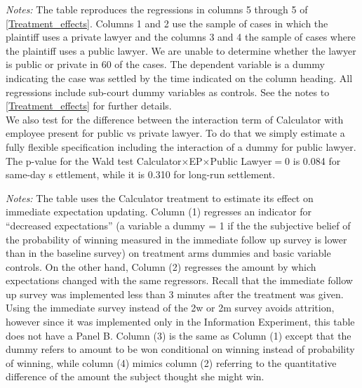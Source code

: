 \documentclass[11pt, a4paper]{article}
\begin{document}
\begin{table}[!ht]
    \caption{Treatment Effects conditional on type of lawyer}
    \label{te_bylawyer}
    \begin{center}
    \scriptsize{}
    \end{center}
     \scriptsize
    \textit{Notes:} The table reproduces the regressions in columns 5 through 5 of \ref{Treatment_effects}. Columns 1 and 2 use the sample of cases in which the plaintiff uses a private lawyer and the columns 3 and 4 the sample of cases where the plaintiff uses a public lawyer. We are unable to determine whether the lawyer is public or private in 60 of the cases. The dependent variable is a dummy indicating the case was settled by the time indicated on the column heading. All regressions include sub-court dummy variables as controls. See the notes to \ref{Treatment_effects} for further details. \\
         
         
    We also test for the difference between the interaction term of Calculator with employee present for public vs private lawyer. To do that we simply estimate a fully flexible specification including the interaction of a dummy for public lawyer. The p-value for the Wald test Calculator$\times$EP$\times$Public Lawyer$=0$ is 0.084 for same-day s  ettlement, while it is 0.310 for long-run settlement.
\end{table}

\begin{table}[!ht]
    \caption{Immediate expectation updating}
    \label{exp_updating}
    \begin{center}
    \scriptsize{}
    \end{center}
\scriptsize
\textit{Notes:} The table uses the Calculator treatment to estimate its effect on immediate expectation updating. Column (1) regresses an indicator for ``decreased expectations'' (a variable a dummy = 1 if the the subjective belief of the probability of winning measured in the immediate follow up survey is lower than in the baseline survey) on treatment arms dummies and basic variable controls. On the other hand, Column (2) regresses the amount by which expectations changed with the same regressors. Recall that the immediate follow up survey was implemented less than 3 minutes after the treatment was given. Using the immediate survey instead of the 2w or 2m survey avoids attrition, however since it was implemented only in the Information Experiment, this table does not have a Panel B. Column (3) is the same as Column (1) except that the dummy refers to amount to be won conditional on winning instead of probability of winning, while column (4) mimics column (2) referring to the quantitative difference of the amount the subject thought she might win. 
\end{table}
\end{document}
